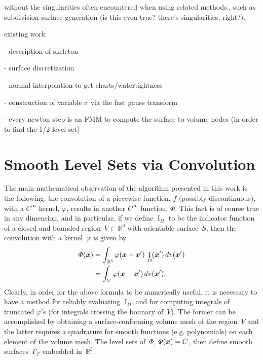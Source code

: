 \documentclass[11pt]{article}
\numberwithin{equation}{section}
\newcommand{\vct}{\vectorsym}
\DeclareMathOperator\indic{I}
\newcommand\bbR{\mathbb R}
\newcommand\bx{\vct{x}}
\renewcommand{\phi}{\varphi}
\begin{document}
 without the singularities often
encountered when using related methods., such as subdivision surface
generation (is this even true? there's singularities, right?).


existing
work~\cite{fleishman2005,bloomenthal1991,sherstyuk1999,sherstyuk1999design}


- description of skeleton

- surface discretization

- normal interpolation to get charts/watertightness

- construction of variable $\sigma$ via the fast gauss transform

- every newton step is an FMM to compute the surface to volume nodes
(in order to find the 1/2 level set)



\section{Smooth Level Sets via Convolution}
\label{sec:smooth}

The main mathematical observation of the algorithm presented in this
work is the following: the convolution of a piecewise function, $f$
(possibly discontinuous), with a $C^\infty$ kernel, $\phi$, results in
another $C^\infty$ function, $\Phi$. This fact is of course true in any
dimension, and in particular, if we define $\indic_\Omega$ to be the
indicator function of a closed and bounded
region~$V \subset \bbR^3$ with orientable surface~$S$, then
the convolution with a kernel~$\phi$ is given by
\begin{equation}
\begin{aligned}
\Phi(\bx) &= \int_{\bbR^3} \phi(\bx-\bx') \, \indic_\Omega(\bx') \, dv(\bx') \\
 &= \int_{V} \phi(\bx-\bx')  \, dv(\bx').
\end{aligned}
\end{equation}
Clearly, in order for the above formula to be numerically useful, it
is necessary to have a method for reliably evaluating $\indic_\Omega$
and for computing integrals of truncated $\phi$'s (for integrals
crossing the bounary of~$V$). The former can be
accomplished by obtaining a surface-conforming volume mesh of the
region~$V$ and the latter requires a quadrature for smooth
functions (e.g. polynomials) on each element of the volume mesh. The
level sets of~$\Phi$, $\Phi(\bx) = C$, then define smooth
surfaces~$\Gamma_C$ embedded in~$\bbR^3$.
\end{document}
